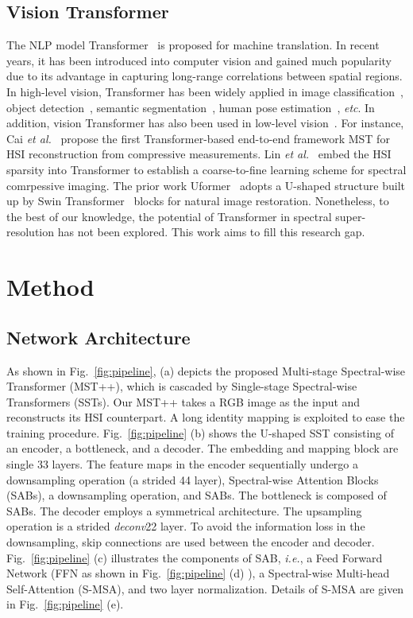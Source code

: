 \documentclass[10pt,twocolumn,letterpaper]{article}
\begin{document}
\subsection{Vision Transformer}
\noindent The NLP model Transformer~\cite{vaswani2017attention} is  proposed for machine translation. In recent years, it has been introduced into computer vision and gained much popularity due to its advantage in capturing long-range correlations between spatial regions. In high-level vision, Transformer has been widely applied in image classification~\cite{liu2021swin,arnab2021vivit,global_msa,xcit,tc_2,tc_1}, object detection~\cite{de_detr,DETR,dy_detr,to_3,to_2,to_1}, semantic segmentation~\cite{tc_3,cao2021swin,SETR,ts_1,ts_2,ts_3}, human pose estimation~\cite{tokenpose,transpose,rsn,cai2019joint,udp++,prtr,th_1,th_2,th_3},  \emph{etc}. In addition, vision Transformer has also been used in low-level vision~\cite{mst,vsrt,ipt,rformer,swinir,fgst,cst}. For instance, Cai \emph{et al.}~\cite{mst} propose the first Transformer-based end-to-end framework MST for HSI reconstruction from compressive measurements. Lin \emph{et al.}~\cite{cst} embed the HSI sparsity into Transformer to establish a coarse-to-fine learning scheme for spectral comrpessive imaging. The prior work Uformer~\cite{uformer} adopts a U-shaped structure built up by Swin Transformer~\cite{liu2021swin} blocks for natural image restoration. Nonetheless, to the best of our knowledge, the potential of Transformer in spectral super-resolution has not been explored. This work aims to fill this research gap.

\section{Method}
\subsection{Network Architecture}
As shown in Fig.~\ref{fig:pipeline}, (a) depicts the proposed Multi-stage Spectral-wise Transformer (MST++), which is cascaded by  Single-stage Spectral-wise Transformers (SSTs). Our MST++ takes a RGB image as the input and reconstructs its HSI counterpart. A long identity mapping is exploited to ease the training procedure. Fig.~\ref{fig:pipeline} (b) shows the U-shaped SST consisting of an encoder, a bottleneck, and a decoder. The embedding and mapping block are single 33 layers. The feature maps in the encoder sequentially undergo a downsampling operation (a strided 44 layer),  Spectral-wise Attention Blocks (SABs), a downsampling operation, and  SABs. The bottleneck is composed of  SABs. The decoder employs a symmetrical architecture. The upsampling operation is a strided \emph{deconv}22 layer. To avoid the information loss in the downsampling, skip connections are used between the encoder and decoder. Fig.~\ref{fig:pipeline} (c) illustrates the components of SAB, \emph{i.e.}, a Feed Forward Network (FFN as shown in Fig.~\ref{fig:pipeline} (d) ), a Spectral-wise Multi-head Self-Attention (S-MSA), and two layer normalization. Details of S-MSA are given in Fig.~\ref{fig:pipeline} (e).
\end{document}
